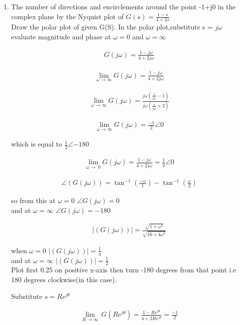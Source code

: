 \begin{enumerate}[label=\thesection.\arabic*.,ref=\thesection.\theenumi]
\item The number of directions and encirclements around the point -1+j0 in the complex plane by the Nyquist plot of $G(s) = \frac{1-s}{4+2s}$\\

\solution
Draw the polar plot of given G(S).
In the polar plot,substitute s = $j\omega$ evaluate magnitude and phase at $\omega = 0$ and $\omega = \infty$

\begin{align}
G(j\omega) = \frac{1-j\omega}{4+2j\omega} 
\end{align}

\begin{align}
\lim_{\omega\to\infty} G(j\omega) = \frac{1-j\omega}{4+2j\omega} 
\end{align}

\begin{align}
\lim_{\omega\to\infty} G(j\omega) = \frac{j\omega(\frac{1}{j\omega}-1)}{j\omega(\frac{4}{j\omega}+2)}  
\end{align}

\begin{align}
\lim_{\omega\to\infty} G(j\omega) = \frac{-1}{2}\angle 0  
\end{align}
\begin{center}
which is equal to $\frac{1}{2}\angle{-180}$   
\end{center}
\begin{align}
\lim_{\omega\to\ 0} G(j\omega) = \frac{1-j\omega}{4+2j\omega} = \frac{1}{4}\angle 0 
\end{align}

\begin{align}
\angle (G(j\omega)) = \tan^{-1}(\frac{-\omega}{1}) - \tan^{-1}(\frac{\omega}{2})
\end{align}

so from this  at $\omega = 0$ $\angle G(j\omega) = 0$ 
\\
and at $\omega = \infty$ $\angle G(j\omega)  =-180$     


\begin{align}
\mid(G(j\omega))\mid = \frac{\sqrt{1+{\omega}^2}}{\sqrt{16+{4\omega}^2}} 
\end{align}

when $\omega = 0$ $\mid(G(j\omega))\mid = \frac{1}{4}$ 
\\
and at  $\omega = \infty$ $\mid(G(j\omega))\mid = \frac{1}{2}$
\\
Plot first 0.25 on positive x-axis then turn {-180} degrees from that point i.e {180} degrees clockwise(in this case).\\
\begin{center}
Substitute $s = Re^{j\theta}$
\end{center}
\begin{align}
\lim_{R\to \infty}\,G(Re^{j\theta})=\frac{1-Re^{j\theta}}{4+2Re^{j\theta}}=\frac{-1}{2}  
\end{align}


\end{enumerate}
